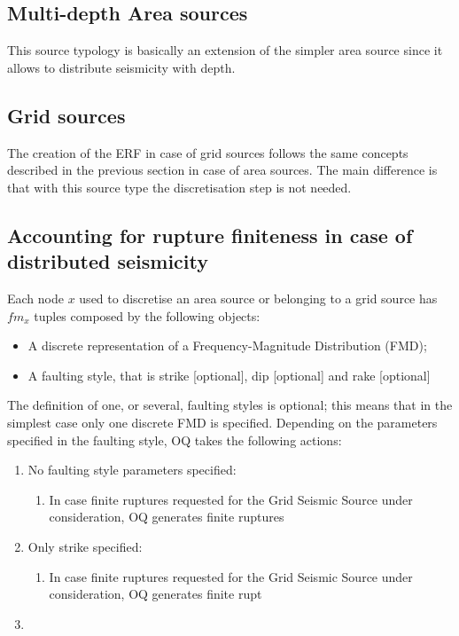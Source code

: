 %
\subsection{Multi-depth Area sources}
%
This source typology is basically an extension of the simpler area source since 
it allows to distribute seismicity with depth.

%
\subsection{Grid sources}
The creation of the ERF in case of grid sources follows the same concepts described in the previous section in case of area sources. The main difference is that with this source type the discretisation step is not needed.

\subsection{Accounting for rupture finiteness in case of distributed seismicity}
%
Each node $x$ used to discretise an area source or belonging to a grid source  has $fm_{x}$ tuples composed by the following objects:
\begin{itemize}
\item A discrete representation of a Frequency-Magnitude Distribution (FMD);
\item A faulting style, that is strike [optional], dip [optional] and rake [optional] 
\end{itemize}
The definition of one, or several, faulting styles is optional; this means that 
in the simplest case only one discrete FMD is specified.
Depending on the parameters specified in the faulting style, OQ takes the following actions:
\begin{enumerate}
\item No faulting style parameters specified:
	\begin{enumerate}
	\item In case finite ruptures requested for the Grid Seismic Source under consideration, OQ generates finite ruptures 
	\end{enumerate}
\item Only strike specified:
	\begin{enumerate}
	\item In case finite ruptures requested for the Grid Seismic Source under consideration, OQ generates finite rupt
	\end{enumerate}
\item
\end{enumerate}


